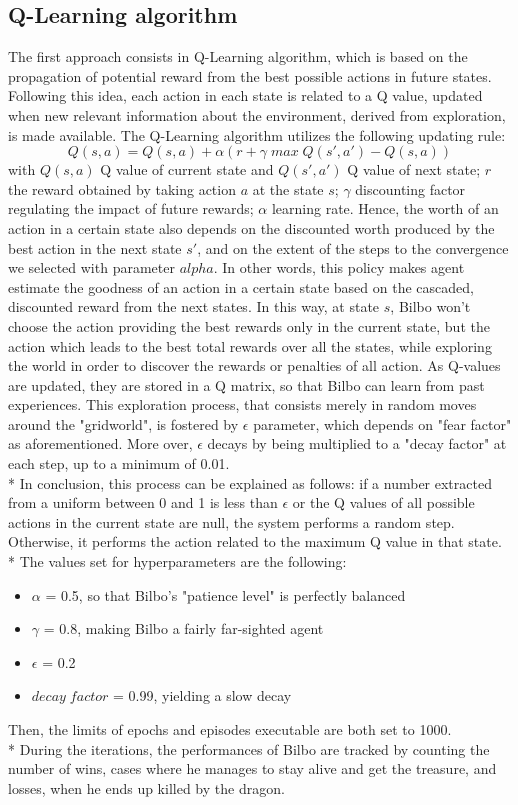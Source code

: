 \subsection{Q-Learning algorithm}
The first approach consists in Q-Learning algorithm, which is based on the propagation of potential reward from the best possible actions in future states. Following this idea, each action in each state is related to a Q value, updated when new relevant information about the environment, derived from exploration, is made available. The Q-Learning algorithm utilizes the following updating rule:
$$Q(s,a)=Q(s,a)+\alpha(r+\gamma\;max\;Q(s',a') - Q(s,a))$$
with $Q(s,a)$ Q value of current state and $Q(s',a')$ Q value of next state; $r$ the reward obtained by taking action $a$ at the state $s$; $\gamma$ discounting factor regulating the impact of future rewards; $\alpha$ learning rate. Hence, the worth of an action in a certain state also depends on the discounted worth produced by the best action in the next state $s'$, and on the extent of the steps to the convergence we selected with parameter $alpha$. In other words, this policy makes agent estimate the goodness of an action in a certain state based on the cascaded, discounted reward from the next states. In this way, at state $s$, Bilbo won't choose the action providing the best rewards only in the current state, but the action which leads to the best total rewards over all the states, while exploring the world in order to discover the rewards or penalties of all action. As Q-values are updated, they are stored in a Q matrix, so that Bilbo can learn from past experiences. This exploration process, that consists merely in random moves around the "gridworld", is fostered by $\epsilon$ parameter, which depends on "fear factor" as aforementioned. More over, $\epsilon$ decays by being multiplied to a "decay factor" at each step, up to a minimum of 0.01.\\*
In conclusion, this process can be explained as follows: if a number extracted from a uniform between 0 and 1 is less than $\epsilon$ or the Q values of all possible actions in the current state are null, the system performs a random step. Otherwise, it performs the action related to the maximum Q value in that state.\\*
The values set for hyperparameters are the following:
\begin{itemize}
  \item $\alpha$ = 0.5, so that Bilbo's "patience level" is perfectly balanced
  \item $\gamma$ = 0.8, making Bilbo a fairly far-sighted agent 
  \item $\epsilon$ = 0.2
  \item $decay\;factor$ = 0.99, yielding a slow decay
\end{itemize} 
Then, the limits of epochs and episodes executable are both set to 1000.\\*
During the iterations, the performances of Bilbo are tracked by counting the number of wins, cases where he manages to stay alive and get the treasure, and losses, when he ends up killed by the dragon.

